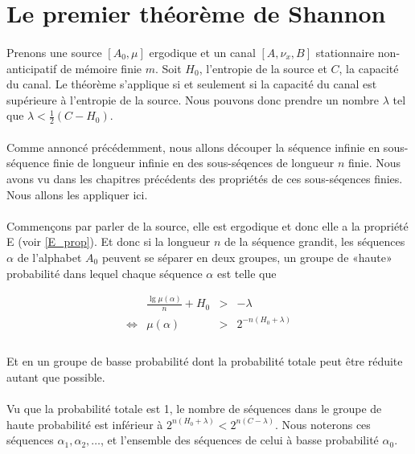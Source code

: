 \section{Le premier théorème de Shannon}

	\paragraph{}
	Prenons une source $[A_0,\mu]$ ergodique et un canal $[A,\nu_x,B]$ stationnaire non-anticipatif de mémoire finie $m$. 
	Soit $H_0$, l'entropie de la source et $C$, la capacité du canal. Le théorème s'applique si et seulement si la capacité 
	du canal est supérieure à l'entropie de la source. Nous pouvons donc prendre un nombre $\lambda$ tel que $\lambda<\frac{1}{2}(C-H_0)$. 
	
	\paragraph{}
	Comme annoncé précédemment, nous allons découper la séquence infinie en sous-séquence finie de longueur infinie en des sous-séqences 
	de longueur $n$ finie. Nous avons vu dans les chapitres précédents des propriétés de ces sous-séqences finies. Nous allons les appliquer ici.

	\paragraph{}
	Commençons par parler de la source, elle est ergodique et donc elle a la propriété E (voir \ref{E_prop}). 
	Et donc si la longueur $n$ de la séquence grandit, les séquences $\alpha$ de l'alphabet	$A_0$ peuvent se 
	séparer en deux groupes, un groupe de «haute» probabilité dans lequel chaque séquence $\alpha$ est telle que
	
	\[
		\begin{array}{crcl}
			&\frac{\lg \mu\left(\alpha\right)}{n}+H_0 &>& -\lambda\\
			\Leftrightarrow & \mu(\alpha) & > &2^{-n\left(H_0+\lambda\right)}\\
		\end{array}
	\]
	
	\paragraph{}
	Et en un groupe de basse probabilité dont la probabilité totale peut être réduite autant que possible.

	\paragraph{}
	Vu que la probabilité totale est 1, le nombre de séquences dans le groupe de haute probabilité est inférieur à $2^{n(H_0+\lambda)}<2^{n(C-\lambda)}$.
	Nous noterons ces séquences $\alpha_1,\alpha_2,\dots$, et l'ensemble des séquences de celui à basse probabilité $\alpha_0$.
	
